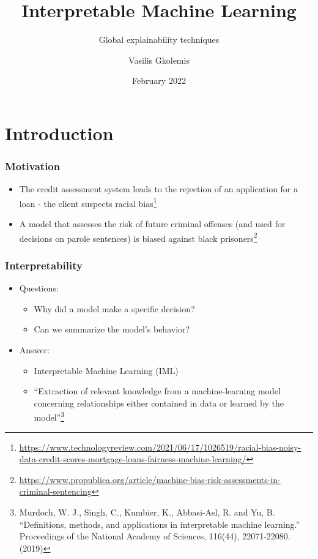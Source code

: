 \documentclass{beamer}
\title[IML]{Interpretable Machine Learning}
\subtitle{Global explainability techniques}
\author[Gkolemis, Vasilis] %
{Vasilis Gkolemis\inst{1}\inst{2}}
\institute[VASILIS]
{
  \inst{1}%
  ATHENA Research and Innovation Center \and
  \inst{2}%
  Harokopio University of Athens
}
\date{February 2022}
\begin{document}
\frame{\titlepage}

\section{Introduction}

\begin{frame}
  \frametitle{Motivation}

  \begin{itemize}
  \item<1-> The credit assessment system leads to the rejection of an
    application for a loan - the client suspects racial bias\footnote{\url{https://www.technologyreview.com/2021/06/17/1026519/racial-bias-noisy-data-credit-scores-mortgage-loans-fairness-machine-learning/}}
  \item<2-> A model that assesses the risk of future criminal offenses (and
    used for decisions on parole sentences) is biased against black
    prisoners\footnote{\url{https://www.propublica.org/article/machine-bias-risk-assessments-in-criminal-sentencing}}
  \end{itemize}

\end{frame}


\begin{frame}
  \frametitle{Interpretability}
  \begin{itemize}
    \item Questions:
    \begin{itemize}
    \item Why did a model make a specific decision?
    \item Can we summarize the model's behavior?
    \end{itemize}
  \item Answer:
    \begin{itemize}
    \item Interpretable Machine Learning (IML)
    \item ``Extraction of relevant knowledge from a machine-learning model
    concerning relationships either contained in data or learned by the
    model''\footnote{Murdoch, W. J., Singh, C., Kumbier, K., Abbasi-Asl, R. and
    Yu, B. ``Definitions, methods, and applications in interpretable machine
    learning.'' Proceedings of the National Academy of Sciences, 116(44),
    22071-22080. (2019)}
  \end{itemize}
  \end{itemize}
\end{frame}
\end{document}
